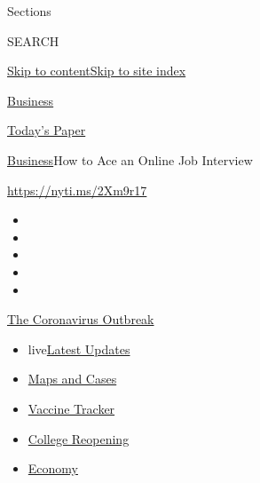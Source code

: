 Sections

SEARCH

\protect\hyperlink{site-content}{Skip to
content}\protect\hyperlink{site-index}{Skip to site index}

\href{https://www.nytimes.com/section/business}{Business}

\href{https://myaccount.nytimes.com/auth/login?response_type=cookie\&client_id=vi}{}

\href{https://www.nytimes.com/section/todayspaper}{Today's Paper}

\href{/section/business}{Business}\textbar{}How to Ace an Online Job
Interview

\url{https://nyti.ms/2Xm9r17}

\begin{itemize}
\item
\item
\item
\item
\item
\end{itemize}

\href{https://www.nytimes.com/news-event/coronavirus?action=click\&pgtype=Article\&state=default\&region=TOP_BANNER\&context=storylines_menu}{The
Coronavirus Outbreak}

\begin{itemize}
\tightlist
\item
  live\href{https://www.nytimes.com/2020/08/03/world/coronavirus-covid-19.html?action=click\&pgtype=Article\&state=default\&region=TOP_BANNER\&context=storylines_menu}{Latest
  Updates}
\item
  \href{https://www.nytimes.com/interactive/2020/us/coronavirus-us-cases.html?action=click\&pgtype=Article\&state=default\&region=TOP_BANNER\&context=storylines_menu}{Maps
  and Cases}
\item
  \href{https://www.nytimes.com/interactive/2020/science/coronavirus-vaccine-tracker.html?action=click\&pgtype=Article\&state=default\&region=TOP_BANNER\&context=storylines_menu}{Vaccine
  Tracker}
\item
  \href{https://www.nytimes.com/2020/08/02/us/covid-college-reopening.html?action=click\&pgtype=Article\&state=default\&region=TOP_BANNER\&context=storylines_menu}{College
  Reopening}
\item
  \href{https://www.nytimes.com/live/2020/08/03/business/stock-market-today-coronavirus?action=click\&pgtype=Article\&state=default\&region=TOP_BANNER\&context=storylines_menu}{Economy}
\end{itemize}

